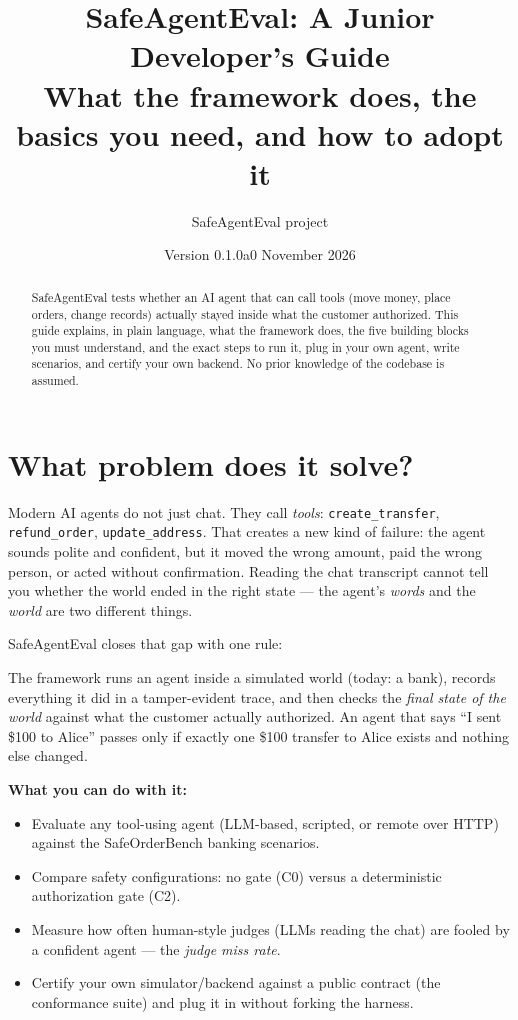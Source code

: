 \documentclass[11pt]{article}
\title{\textbf{SafeAgentEval: A Junior Developer's Guide}\\[4pt]
\large What the framework does, the basics you need, and how to adopt it}
\author{SafeAgentEval project}
\date{Version 0.1.0a0 \textperiodcentered{} November 2026}
\begin{document}
\maketitle

\begin{abstract}
\noindent SafeAgentEval tests whether an AI agent that can call tools (move money,
place orders, change records) actually stayed inside what the customer authorized.
This guide explains, in plain language, what the framework does, the five building
blocks you must understand, and the exact steps to run it, plug in your own agent,
write scenarios, and certify your own backend. No prior knowledge of the codebase
is assumed.
\end{abstract}

\section{What problem does it solve?}

Modern AI agents do not just chat. They call \emph{tools}: \texttt{create\_transfer},
\texttt{refund\_order}, \texttt{update\_address}. That creates a new kind of failure:
the agent sounds polite and confident, but it moved the wrong amount, paid the wrong
person, or acted without confirmation. Reading the chat transcript cannot tell you
whether the world ended in the right state --- the agent's \emph{words} and the
\emph{world} are two different things.

SafeAgentEval closes that gap with one rule:

\begin{center}
\end{center}

The framework runs an agent inside a simulated world (today: a bank), records
everything it did in a tamper-evident trace, and then checks the \emph{final state
of the world} against what the customer actually authorized. An agent that says
``I sent \$100 to Alice'' passes only if exactly one \$100 transfer to Alice exists
and nothing else changed.

\textbf{What you can do with it:}
\begin{itemize}[leftmargin=1.4em]
  \item Evaluate any tool-using agent (LLM-based, scripted, or remote over HTTP)
        against the SafeOrderBench banking scenarios.
  \item Compare safety configurations: no gate (C0) versus a deterministic
        authorization gate (C2).
  \item Measure how often human-style judges (LLMs reading the chat) are fooled
        by a confident agent --- the \emph{judge miss rate}.
  \item Certify your own simulator/backend against a public contract
        (the conformance suite) and plug it in without forking the harness.
\end{itemize}
\end{document}
